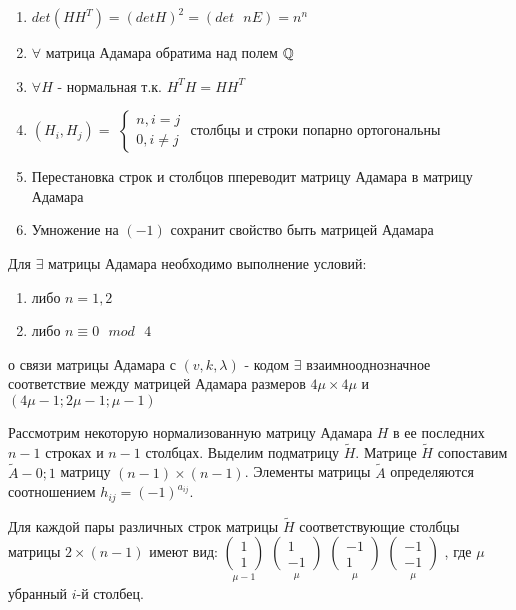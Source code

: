 \prop
\begin{enumerate}
	\item $det(HH^T) = (detH)^2 = (det \text{ } nE) = n^n$
	\item $\forall$ матрица Адамара обратима над полем $\mathbb{Q}$
	\item $\forall H$ - нормальная т.к. $H^TH = HH^T$
	\item $(H_i, H_j) = $
	$\begin{cases}
		n, i = j \\
		0, i \neq j
	\end{cases}$
	столбцы и строки попарно ортогональны
	\item Перестановка строк и столбцов ппереводит матрицу Адамара в матрицу Адамара
	\item Умножение на $(-1)$ сохранит свойство быть матрицей Адамара
\end{enumerate}

\thr
Для $\exists$ матрицы Адамара необходимо выполнение условий:
\begin{enumerate}
	\item либо $n = 1,2$
	\item либо $n \equiv 0 \text{ } mod \text{ } 4$
\end{enumerate}

\thr о связи матрицы Адамара с $(v, k, \lambda)$ - кодом
$\exists$ взаимнооднозначное соответствие между матрицей Адамара размеров $4\mu \times 4\mu$
и $(4\mu - 1; 2\mu - 1; \mu - 1)$

\proof
Рассмотрим некоторую нормализованную матрицу Адамара $H$ в ее последних $n - 1$ строках
и $n - 1$ столбцах. Выделим подматрицу $\tilde{H}$. Матрице $\tilde{H}$ сопоставим $\tilde{A} - 0;1$
матрицу $(n - 1)\times (n - 1)$. Элементы  матрицы $\tilde{A}$ определяются соотношением
$h_{ij} = (-1)^{a_{ij}}$.

Для каждой пары различных строк матрицы $\tilde{H}$ соответствующие столбцы матрицы $2\times (n - 1)$
имеют вид: 
$\underset{
\mu - 1
}{
\begin{pmatrix}
	1 \\
	1
\end{pmatrix}	
}$
$\underset{
\mu
}{
\begin{pmatrix}
	1 \\
	-1
\end{pmatrix}	
}$
$\underset{
\mu
}{
\begin{pmatrix}
	-1 \\
	1
\end{pmatrix}	
}$
$\underset{
\mu
}{
\begin{pmatrix}
	-1 \\
	-1
\end{pmatrix}	
}$
, где $\mu$ убранный $i$-й столбец.

